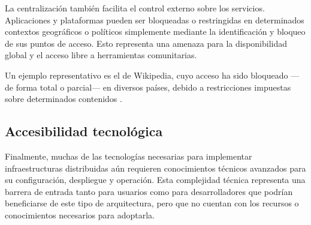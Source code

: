 La centralización también facilita el control externo sobre los servicios. Aplicaciones y plataformas pueden ser bloqueadas o restringidas en determinados contextos geográficos o políticos simplemente mediante la identificación y bloqueo de sus puntos de acceso. Esto representa una amenaza para la disponibilidad global y el acceso libre a herramientas comunitarias.

Un ejemplo representativo es el de Wikipedia, cuyo acceso ha sido bloqueado —de forma total o parcial— en diversos países, debido a restricciones impuestas sobre determinados contenidos \parencite{censorship-wikipedia}.

\subsection{Accesibilidad tecnológica}

Finalmente, muchas de las tecnologías necesarias para implementar infraestructuras distribuidas aún requieren conocimientos técnicos avanzados para su configuración, despliegue y operación. Esta complejidad técnica representa una barrera de entrada tanto para usuarios como para desarrolladores que podrían beneficiarse de este tipo de arquitectura, pero que no cuentan con los recursos o conocimientos necesarios para adoptarla.